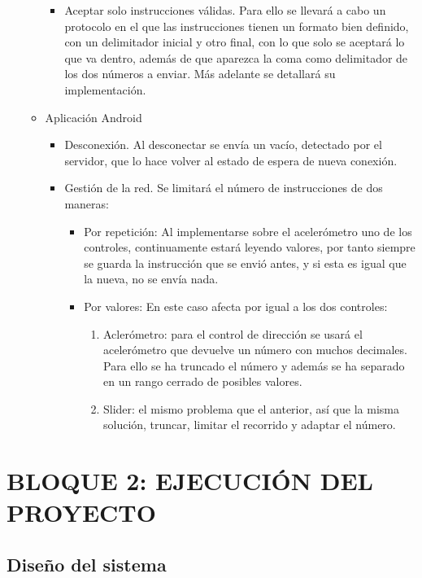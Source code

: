 \documentclass{pclass}
\begin{document}
\begin{itemize}
\begin{itemize}
\begin{itemize}
			\item Aceptar solo instrucciones válidas. Para ello se llevará a cabo un protocolo en el que las instrucciones tienen un formato bien definido, con un delimitador inicial y otro final, con lo que solo se aceptará lo que va dentro, además de que aparezca la coma como delimitador de los dos números a enviar. Más adelante se detallará su implementación.
		\end{itemize}
		\item Aplicación Android
		\begin{itemize}
			\item Desconexión. Al desconectar se envía un vacío, detectado por el servidor, que lo hace volver al estado de espera de nueva conexión.
			\item Gestión de la red. Se limitará el número de instrucciones de dos maneras:
				\begin{itemize}
					\item Por repetición: Al implementarse sobre el acelerómetro uno de los controles, continuamente estará leyendo valores, por tanto siempre se guarda la instrucción que se envió antes, y si esta es igual que la nueva, no se envía nada.
					
					\item Por valores: En este caso afecta por igual a los dos controles:
						\begin{enumerate}
							\item Aclerómetro: para el control de dirección se usará el acelerómetro que devuelve un número con muchos decimales. Para ello se ha truncado el número y además se ha separado en un rango cerrado de posibles valores.
							\item Slider: el mismo problema que el anterior, así que la misma solución, truncar, limitar el recorrido y adaptar el número.
						\end{enumerate}
				\end{itemize}
		\end{itemize}
	\end{itemize}

\end{itemize}



\chapter{BLOQUE 2: EJECUCIÓN DEL PROYECTO}
\section{Diseño del sistema}
\end{document}
